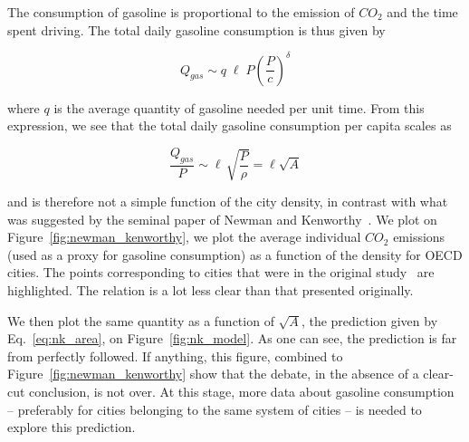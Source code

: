 The consumption of gasoline is proportional to the emission of $CO_2$ and the time spent driving.
The total daily gasoline consumption is thus given by

\begin{equation} 
    Q_{gas} \sim q\; \ell\; P \left(\frac{P}{c}\right)^{\delta}
\end{equation}

where $q$ is the average quantity of gasoline needed per unit time. From this
expression, we see that the total daily gasoline consumption per capita scales
as

\begin{equation} 
    \frac{Q_{gas}}{P}\sim \ell\, \sqrt{\frac{P}{\rho}} = \ell
\sqrt{A} 
    \label{eq:nk_area}
\end{equation}

and is therefore not a simple function of the city density, in contrast with
what was suggested by the seminal paper of Newman and
Kenworthy~\cite{Newman:1989}. We plot on Figure~\ref{fig:newman_kenworthy}, we
plot the average individual $CO_2$ emissions (used as a proxy for gasoline
consumption) as a function of the density for OECD cities. The points
corresponding to cities that were in the original study~\cite{Newman:1989} are
highlighted. The relation is a lot less clear than that presented originally.  

We then plot the same quantity as a function of $\sqrt{A}$, the prediction given
by Eq.~\ref{eq:nk_area}, on Figure~\ref{fig:nk_model}. As one can see, the
prediction is far from perfectly followed. If anything, this figure, combined to
Figure~\ref{fig:newman_kenworthy} show that the debate, in the absence of a
clear-cut conclusion, is not over. At this stage, more data about gasoline
consumption -- preferably for cities belonging to the same system of cities --
is needed to explore this prediction.

